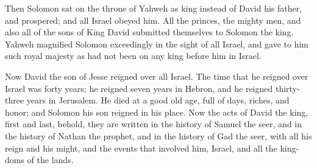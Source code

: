 \begin{paracol}{2}
\begin{otherlanguage}{english}
 Then Solomon sat on the throne of Yahweh as king instead
of David his father, and prospered; and all Israel obeyed him.
 All the princes, the mighty men, and also all of the
sons of King David submitted themselves to Solomon the king.
 Yahweh magnified Solomon exceedingly in the sight of all
Israel, and gave to him such royal majesty as had not been on any king
before him in Israel.

 Now David the son of Jesse reigned over all Israel.
 The time that he reigned over Israel was forty years; he
reigned seven years in Hebron, and he reigned thirty-three years in
Jerusalem.  He died at a good old age, full of days,
riches, and honor; and Solomon his son reigned in his place.
 Now the acts of David the king, first and last, behold,
they are written in the history of Samuel the seer, and in the history
of Nathan the prophet, and in the history of Gad the seer,
 with all his reign and his might, and the events that
involved him, Israel, and all the kingdoms of the lands.
\end{otherlanguage} \end{paracol}
